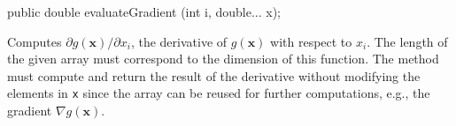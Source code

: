 \begin{code}

   public double evaluateGradient (int i, double... x);\end{code}
\begin{tabb}   Computes $\partial g(\mathbf{x})/\partial x_i$,
 the derivative of $g(\mathbf{x})$
 with respect to $x_i$.    The length of the
 given array must correspond to the dimension of
 this function.  The method must compute and return the result
 of the derivative without modifying the elements
 in \texttt{x} since the array can be reused for
 further computations, e.g., the gradient $\nabla g(\mathbf{x})$.
\end{tabb}
\begin{htmlonly}
\end{htmlonly}
\begin{code}\begin{hide}
}\end{hide}
\end{code}
